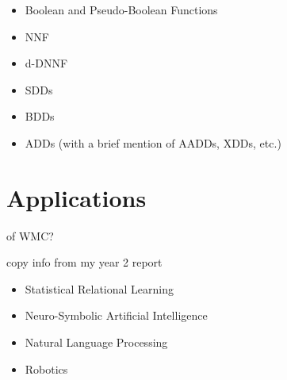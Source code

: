 \begin{itemize}
\item Boolean and Pseudo-Boolean Functions
\item NNF
\item d-DNNF
\item SDDs
\item BDDs
\item ADDs (with a brief mention of AADDs, XDDs, etc.)
\end{itemize}

\section{Applications}

of WMC?

copy info from my year 2 report

\begin{itemize}
\item Statistical Relational Learning
\item Neuro-Symbolic Artificial Intelligence
\item Natural Language Processing
\item Robotics
\end{itemize}
